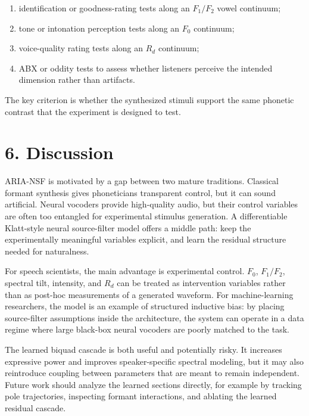 \documentclass[
  10pt,
]{article}
\providecommand{\tightlist}{%
  \setlength{\itemsep}{0pt}\setlength{\parskip}{0pt}}
\begin{document}
\begin{enumerate}
\def\labelenumi{\arabic{enumi}.}
\tightlist
\item
  identification or goodness-rating tests along an \(F_1/F_2\) vowel
  continuum;
\item
  tone or intonation perception tests along an \(F_0\) continuum;
\item
  voice-quality rating tests along an \(R_d\) continuum;
\item
  ABX or oddity tests to assess whether listeners perceive the intended
  dimension rather than artifacts.
\end{enumerate}

The key criterion is whether the synthesized stimuli support the same
phonetic contrast that the experiment is designed to test.

\section{6. Discussion}\label{discussion}

ARIA-NSF is motivated by a gap between two mature traditions. Classical
formant synthesis gives phoneticians transparent control, but it can
sound artificial. Neural vocoders provide high-quality audio, but their
control variables are often too entangled for experimental stimulus
generation. A differentiable Klatt-style neural source-filter model
offers a middle path: keep the experimentally meaningful variables
explicit, and learn the residual structure needed for naturalness.

For speech scientists, the main advantage is experimental control.
\(F_0\), \(F_1/F_2\), spectral tilt, intensity, and \(R_d\) can be
treated as intervention variables rather than as post-hoc measurements
of a generated waveform. For machine-learning researchers, the model is
an example of structured inductive bias: by placing source-filter
assumptions inside the architecture, the system can operate in a data
regime where large black-box neural vocoders are poorly matched to the
task.

The learned biquad cascade is both useful and potentially risky. It
increases expressive power and improves speaker-specific spectral
modeling, but it may also reintroduce coupling between parameters that
are meant to remain independent. Future work should analyze the learned
sections directly, for example by tracking pole trajectories, inspecting
formant interactions, and ablating the learned residual cascade.
\end{document}
